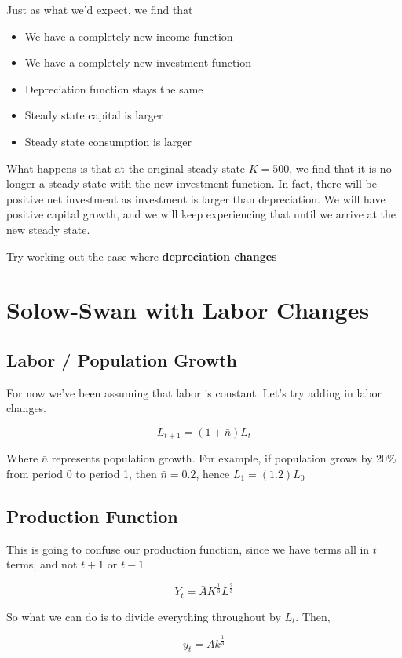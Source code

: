 \documentclass[11pt]{scrartcl}
\newcommand{\oneth}{\ensuremath{\frac{1}{3}}}
\newcommand{\twoth}{\ensuremath{\frac{2}{3}}}
\begin{document}
Just as what we'd expect, we find that

\begin{itemize}
\item We have a completely new income function
\item We have a completely new investment function
\item Depreciation function stays the same
\item Steady state capital is larger
\item Steady state consumption is larger
\end{itemize}

What happens is that at the original steady state $K=500$, we find that it is no longer a steady state with the new investment function. In fact, there will be positive net investment as investment is larger than depreciation. We will have positive capital growth, and we will keep experiencing that until we arrive at the new steady state.

Try working out the case where \textbf{depreciation changes}

\section{Solow-Swan with Labor Changes}

\subsection{Labor / Population Growth}

For now we've been assuming that labor is constant. Let's try adding in labor changes.

\[L_{t+1} = (1+\bar{n}) L_t \]

Where $\bar{n}$ represents population growth. For example, if population grows by 20\% from period 0 to period 1, then $\bar{n} = 0.2$, hence $L_1 = (1.2)L_0$

\subsection{Production Function}

This is going to confuse our production function, since we have terms all in $t$ terms, and not $t+1$ or $t-1$

\[Y_t = \bar{A}K^\oneth L^\twoth \]

So what we can do is to divide everything throughout by $L_t$. Then,

\[y_t = \bar{A}k^\oneth \]
\end{document}
